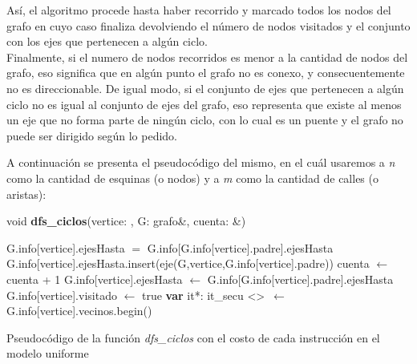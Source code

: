 Así, el algoritmo procede hasta haber recorrido y marcado todos los nodos del grafo en cuyo caso finaliza devolviendo el número de nodos visitados y el conjunto con los ejes que pertenecen a algún ciclo. \\
Finalmente, si el numero de nodos recorridos es menor a la cantidad de nodos del grafo, eso significa que en algún punto el grafo no es conexo, y consecuentemente no es direccionable. De igual modo, si el conjunto de ejes que pertenecen a algún ciclo no es igual al conjunto de ejes del grafo, eso representa que existe al menos un eje que no forma parte de ningún ciclo, con lo cual es un puente y el grafo no puede ser dirigido según lo pedido.

A continuación se presenta el pseudocódigo del mismo, en el cuál usaremos a \textit{n} como la cantidad de esquinas (o nodos) y a \textit{m} como la cantidad de calles (o aristas): \\

\incmargin{1em}
\linesnumbered
{}

void \textbf{dfs\_ciclos}(vertice: \nat, G: grafo\&, cuenta: \nat\&) \\
\begin{algorithm}[H]
	\BlankLine
	G.info[vertice].ejesHasta $=$ G.info[G.info[vertice].padre].ejesHasta 
	G.info[vertice].ejesHasta.insert(eje(G,vertice,G.info[vertice].padre)) 
	cuenta $\leftarrow$ cuenta + 1 
	G.info[vertice].ejesHasta $\leftarrow$ G.info[G.info[vertice].padre].ejesHasta 
	G.info[vertice].visitado $\leftarrow$ true 
	\BlankLine
	\textbf{var} it*: it\_secu \textless \nat \textgreater \ $\leftarrow $ G.info[vertice].vecinos.begin() 
	\BlankLine

	\caption{Pseudocódigo de la función \textit{dfs\_ciclos} con el costo de cada instrucción en el modelo uniforme}
\end{algorithm}

